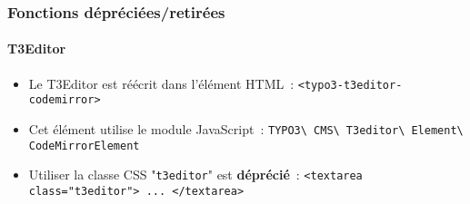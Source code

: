 %

\begin{frame}[fragile]
	\frametitle{Fonctions dépréciées/retirées}
	\framesubtitle{T3Editor}

	\begin{itemize}
		\item Le T3Editor est réécrit dans l'élément HTML~:\newline
			\smaller\texttt{<typo3-t3editor-codemirror>}\normalsize

		\item Cet élément utilise le module JavaScript~:\newline
			\small
				\texttt{TYPO3\textbackslash
					CMS\textbackslash
					T3editor\textbackslash
					Element\textbackslash
					CodeMirrorElement}
			\normalsize

		\item Utiliser la classe CSS "\texttt{t3editor}" est \textbf{déprécié}~:\newline
			\smaller\texttt{<textarea class="t3editor"> ... </textarea>}\normalsize

	\end{itemize}

\end{frame}

